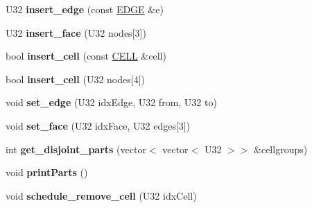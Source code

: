\begin{DoxyCompactItemize}
\item 
\hypertarget{classps_1_1elastic_1_1VolMesh_a5d73955fe15e4e1311ba58d7de64bc14}{}U32 {\bfseries insert\+\_\+edge} (const \hyperlink{classps_1_1elastic_1_1EDGE}{E\+D\+G\+E} \&e)\label{classps_1_1elastic_1_1VolMesh_a5d73955fe15e4e1311ba58d7de64bc14}

\item 
\hypertarget{classps_1_1elastic_1_1VolMesh_a48b3ba9227d5bb8734007d30e69fa254}{}U32 {\bfseries insert\+\_\+face} (U32 nodes\mbox{[}3\mbox{]})\label{classps_1_1elastic_1_1VolMesh_a48b3ba9227d5bb8734007d30e69fa254}

\item 
\hypertarget{classps_1_1elastic_1_1VolMesh_a62787fea4fe6e77eaf880a51c6ae50e2}{}bool {\bfseries insert\+\_\+cell} (const \hyperlink{classps_1_1elastic_1_1CELL}{C\+E\+L\+L} \&cell)\label{classps_1_1elastic_1_1VolMesh_a62787fea4fe6e77eaf880a51c6ae50e2}

\item 
\hypertarget{classps_1_1elastic_1_1VolMesh_ac875d4e69c1367bb9af3bb0de67141a5}{}bool {\bfseries insert\+\_\+cell} (U32 nodes\mbox{[}4\mbox{]})\label{classps_1_1elastic_1_1VolMesh_ac875d4e69c1367bb9af3bb0de67141a5}

\item 
\hypertarget{classps_1_1elastic_1_1VolMesh_a8677786b8f15d5012a2a5c8cf5c99e73}{}void {\bfseries set\+\_\+edge} (U32 idx\+Edge, U32 from, U32 to)\label{classps_1_1elastic_1_1VolMesh_a8677786b8f15d5012a2a5c8cf5c99e73}

\item 
\hypertarget{classps_1_1elastic_1_1VolMesh_ae6b152eca45ca7a1331345a1429b93a1}{}void {\bfseries set\+\_\+face} (U32 idx\+Face, U32 edges\mbox{[}3\mbox{]})\label{classps_1_1elastic_1_1VolMesh_ae6b152eca45ca7a1331345a1429b93a1}

\item 
\hypertarget{classps_1_1elastic_1_1VolMesh_a116c78d4b6e25d725c8ffa6346686f36}{}int {\bfseries get\+\_\+disjoint\+\_\+parts} (vector$<$ vector$<$ U32 $>$$>$ \&cellgroups)\label{classps_1_1elastic_1_1VolMesh_a116c78d4b6e25d725c8ffa6346686f36}

\item 
\hypertarget{classps_1_1elastic_1_1VolMesh_a738d968a386c0f098d9f080d1b508306}{}void {\bfseries print\+Parts} ()\label{classps_1_1elastic_1_1VolMesh_a738d968a386c0f098d9f080d1b508306}

\item 
\hypertarget{classps_1_1elastic_1_1VolMesh_ad1320533258c88bc9bbd92c019e1872f}{}void {\bfseries schedule\+\_\+remove\+\_\+cell} (U32 idx\+Cell)\label{classps_1_1elastic_1_1VolMesh_ad1320533258c88bc9bbd92c019e1872f}


\end{DoxyCompactItemize}
